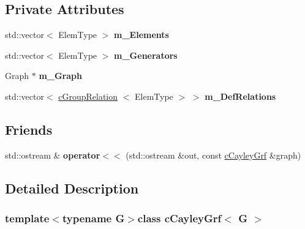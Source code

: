 \subsection*{\-Private \-Attributes}
\begin{DoxyCompactItemize}
\item 
\hypertarget{classcCayleyGrf_af4c3fa359332e9097ad511da6df21e01}{std\-::vector$<$ \-Elem\-Type $>$ {\bfseries m\-\_\-\-Elements}}\label{classcCayleyGrf_af4c3fa359332e9097ad511da6df21e01}

\item 
\hypertarget{classcCayleyGrf_aa0263f38d2605e8b1c43830af0dd7d9b}{std\-::vector$<$ \-Elem\-Type $>$ {\bfseries m\-\_\-\-Generators}}\label{classcCayleyGrf_aa0263f38d2605e8b1c43830af0dd7d9b}

\item 
\hypertarget{classcCayleyGrf_a8ac7f5226ca5868bfb9bbfbd10021981}{\-Graph $\ast$ {\bfseries m\-\_\-\-Graph}}\label{classcCayleyGrf_a8ac7f5226ca5868bfb9bbfbd10021981}

\item 
\hypertarget{classcCayleyGrf_add18aca50d8b803c016d9a8990472a57}{std\-::vector$<$ \hyperlink{classcGroupRelation}{c\-Group\-Relation}\*
$<$ \-Elem\-Type $>$ $>$ {\bfseries m\-\_\-\-Def\-Relations}}\label{classcCayleyGrf_add18aca50d8b803c016d9a8990472a57}

\end{DoxyCompactItemize}
\subsection*{\-Friends}
\begin{DoxyCompactItemize}
\item 
\hypertarget{classcCayleyGrf_a335728ff704ed565af614d4eadbc4609}{std\-::ostream \& {\bfseries operator$<$$<$} (std\-::ostream \&out, const \hyperlink{classcCayleyGrf}{c\-Cayley\-Grf} \&graph)}\label{classcCayleyGrf_a335728ff704ed565af614d4eadbc4609}

\end{DoxyCompactItemize}


\subsection{\-Detailed \-Description}
\subsubsection*{template$<$typename G$>$class c\-Cayley\-Grf$<$ G $>$}

